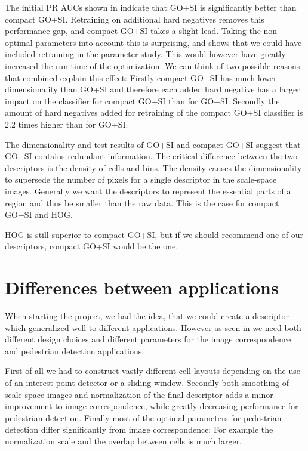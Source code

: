 \documentclass[thesis.tex]{subfiles}
\begin{document}
The initial PR AUCs shown in  indicate that GO+SI is significantly better than compact GO+SI. Retraining on additional hard negatives removes this performance gap, and compact GO+SI takes a slight lead. Taking the non-optimal parameters into account this is surprising, and shows that we could have included retraining in the parameter study. This would however have greatly increased the run time of the optimization. We can think of two possible reasons that combined explain this effect: Firstly compact GO+SI has much lower dimensionality than GO+SI and therefore each added hard negative has a larger impact on the classifier for compact GO+SI than for GO+SI. Secondly the amount of hard negatives added for retraining of the compact GO+SI classifier is 2.2 times higher than for GO+SI.

The dimensionality and test results of GO+SI and compact GO+SI suggest that GO+SI contains redundant information. The critical difference between the two descriptors is the density of cells and bins. The density causes the dimensionality to supersede the number of pixels for a single descriptor in the scale-space images. Generally we want the descriptors to represent the essential parts of a region and thus be smaller than the raw data. This is the case for compact GO+SI and HOG.

HOG is still superior to compact GO+SI, but if we should recommend one of our descriptors, compact GO+SI would be the one.

\section{Differences between applications}
When starting the project, we had the idea, that we could create a descriptor which generalized well to different applications. However as seen in  we need both different design choices and different parameters for the image correspondence and pedestrian detection applications.

First of all we had to construct vastly different cell layouts depending on the use of an interest point detector or a sliding window. Secondly both smoothing of scale-space images and normalization of the final descriptor adds a minor improvement to image correspondence, while greatly decreasing performance for pedestrian detection. Finally most of the optimal parameters for pedestrian detection differ significantly from image correspondence: For example the normalization scale and the overlap between cells is much larger.
\end{document}
